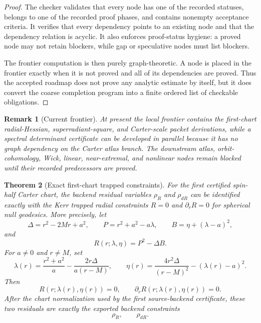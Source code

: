 \documentclass[12pt,a4paper]{article}
\newtheorem{theorem}{Theorem}[section]
\newtheorem{remark}[theorem]{Remark}
\begin{document}
\begin{proof}
The checker validates that every node has one of the recorded statuses, belongs to one of the recorded proof phases, and contains nonempty acceptance criteria. It verifies that every dependency points to an existing node and that the dependency relation is acyclic. It also enforces proof-status hygiene: a proved node may not retain blockers, while gap or speculative nodes must list blockers.

The frontier computation is then purely graph-theoretic. A node is placed in the frontier exactly when it is not proved and all of its dependencies are proved. Thus the accepted roadmap does not prove any analytic estimate by itself, but it does convert the coarse completion program into a finite ordered list of checkable obligations.
\end{proof}

\begin{remark}[Current frontier]
At present the local frontier contains the first-chart radial-Hessian, superradiant-square, and Carter-scale packet derivations, while a spectral determinant certificate can be developed in parallel because it has no graph dependency on the Carter atlas branch. The downstream atlas, orbit-cohomology, Wick, linear, near-extremal, and nonlinear nodes remain blocked until their recorded predecessors are proved.
\end{remark}

\begin{theorem}[Exact first-chart trapped constraints]\label{thm:first-chart-trapped-constraints}
For the first certified spin-half Carter chart, the backend residual variables $\rho_R$ and $\rho_{dR}$ can be identified exactly with the Kerr trapped radial constraints $R=0$ and $\partial_r R=0$ for spherical null geodesics. More precisely, let
\begin{equation}
\Delta = r^2 - 2Mr + a^2,\qquad
P = r^2+a^2-a\lambda,\qquad
B = \eta +(\lambda-a)^2,
\end{equation}
and
\begin{equation}
R(r;\lambda,\eta)=P^2-\Delta B.
\end{equation}
For $a\ne 0$ and $r\ne M$, set
\begin{equation}
\lambda(r)=\frac{r^2+a^2}{a}-\frac{2r\Delta}{a(r-M)},
\qquad
\eta(r)=\frac{4r^2\Delta}{(r-M)^2}-(\lambda(r)-a)^2.
\end{equation}
Then
\begin{equation}
R(r;\lambda(r),\eta(r))=0,\qquad
\partial_r R(r;\lambda(r),\eta(r))=0.
\end{equation}
After the chart normalization used by the first source-backend certificate,
these two residuals are exactly the exported backend constraints
\[
\rho_R,\qquad \rho_{dR}.
\]
\end{theorem}
\end{document}

